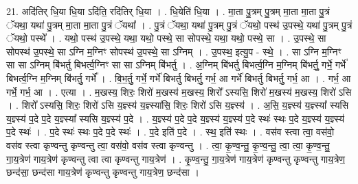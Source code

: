\documentclass[17pt]{extarticle}
\begin{document}
21. अदि॑तिर् धि॒या धि॒या ऽदि॑ति॒ रदि॑तिर् धि॒या । . धि॒येति॑ धि॒या । . मा॒ता पु॒त्रम् पु॒त्रम् मा॒ता मा॒ता पु॒त्रं ॅयथा॒ यथा॑ पु॒त्रम् मा॒ता मा॒ता पु॒त्रं ॅयथा᳚ । . पु॒त्रं ॅयथा॒ यथा॑ पु॒त्रम् पु॒त्रं ॅयथो॒ पस्थ॑ उ॒पस्थे॒ यथा॑ पु॒त्रम् पु॒त्रं ॅयथो॒ पस्थे᳚ । . यथो॒ पस्थ॑ उ॒पस्थे॒ यथा॒ यथो॒ पस्थे॒ सा सोपस्थे॒ यथा॒ यथो॒ पस्थे॒ सा । . उ॒पस्थे॒ सा सोपस्थ॑ उ॒पस्थे॒ सा ऽग्नि म॒ग्निꣳ सोपस्थ॑ उ॒पस्थे॒ सा ऽग्निम् । . उ॒पस्थ॒ इत्यु॒प - स्थे॒ । . सा ऽग्नि म॒ग्निꣳ सा सा ऽग्निम् बि॑भर्तु बिभर्त्व॒ग्निꣳ सा सा ऽग्निम् बि॑भर्तु । . अ॒ग्निम् बि॑भर्तु बिभर्त्व॒ग्नि म॒ग्निम् बि॑भर्तु॒ गर्भे॒ गर्भे॑ बिभर्त्व॒ग्नि म॒ग्निम् बि॑भर्तु॒ गर्भे᳚ । . बि॒भ॒र्तु॒ गर्भे॒ गर्भे॑ बिभर्तु बिभर्तु॒ गर्भ॒ आ गर्भे॑ बिभर्तु बिभर्तु॒ गर्भ॒ आ । . गर्भ॒ आ गर्भे॒ गर्भ॒ आ । . एत्या । . म॒खस्य॒ शिरः॒ शिरो॑ म॒खस्य॑ म॒खस्य॒ शिरो᳚ ऽस्यसि॒ शिरो॑ म॒खस्य॑ म॒खस्य॒ शिरो॑ ऽसि । . शिरो᳚ ऽस्यसि॒ शिरः॒ शिरो॑ ऽसि य॒ज्ञ्स्य॑ य॒ज्ञ्स्या॑सि॒ शिरः॒ शिरो॑ ऽसि य॒ज्ञ्स्य॑ । . अ॒सि॒ य॒ज्ञ्स्य॑ य॒ज्ञ्स्या᳚ स्यसि य॒ज्ञ्स्य॑ प॒दे प॒दे य॒ज्ञ्स्या᳚ स्यसि य॒ज्ञ्स्य॑ प॒दे । . य॒ज्ञ्स्य॑ प॒दे प॒दे य॒ज्ञ्स्य॑ य॒ज्ञ्स्य॑ प॒दे स्थः॑ स्थः प॒दे य॒ज्ञ्स्य॑ य॒ज्ञ्स्य॑ प॒दे स्थः॑ । . प॒दे स्थः॑ स्थः प॒दे प॒दे स्थः॑ । . प॒दे इति॑ प॒दे । . स्थ॒ इति॑ स्थः । . वस॑व स्त्वा त्वा॒ वस॑वो॒ वस॑व स्त्वा कृण्वन्तु कृण्वन्तु त्वा॒ वस॑वो॒ वस॑व स्त्वा कृण्वन्तु । . त्वा॒ कृ॒ण्व॒न्तु॒ कृ॒ण्व॒न्तु॒ त्वा॒ त्वा॒ कृ॒ण्व॒न्तु॒ गा॒य॒त्रेण॑ गाय॒त्रेण॑ कृण्वन्तु त्वा त्वा कृण्वन्तु गाय॒त्रेण॑ । . कृ॒ण्व॒न्तु॒ गा॒य॒त्रेण॑ गाय॒त्रेण॑ कृण्वन्तु कृण्वन्तु गाय॒त्रेण॒ छन्द॑सा॒ छन्द॑सा गाय॒त्रेण॑ कृण्वन्तु कृण्वन्तु गाय॒त्रेण॒ छन्द॑सा । \newline
\end{document}
